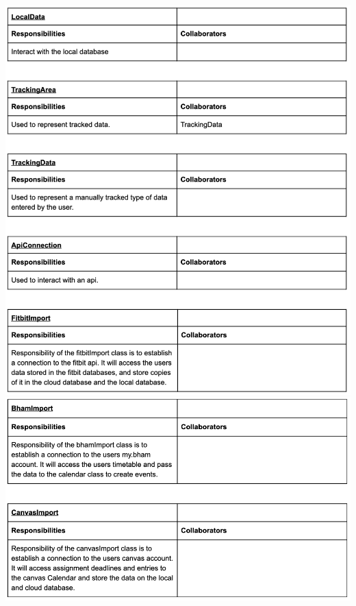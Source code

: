 \documentclass[a4paper,11pt]{article} %
\begin{document}
\begin{center}
  \includegraphics[width=\textwidth]{img/noun-verb/rda-table4.png}
  \includegraphics[width=\textwidth]{img/noun-verb/rda-table5.png}
\end{center}
\newpage
\end{document}
